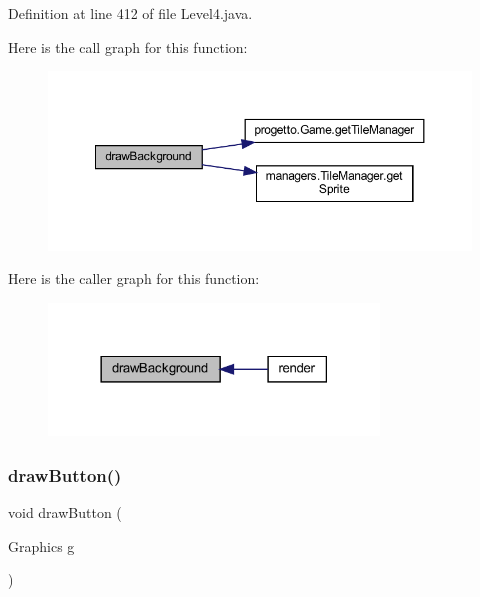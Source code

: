 Definition at line 412 of file Level4.\+java.

Here is the call graph for this function\+:
\nopagebreak
\begin{figure}[H]
\begin{center}
\leavevmode
\includegraphics[width=350pt]{classscenes_1_1_level4_a62bcb07be9e39896e5837a9d396e7235_cgraph}
\end{center}
\end{figure}
Here is the caller graph for this function\+:\nopagebreak
\begin{figure}[H]
\begin{center}
\leavevmode
\includegraphics[width=249pt]{classscenes_1_1_level4_a62bcb07be9e39896e5837a9d396e7235_icgraph}
\end{center}
\end{figure}
\mbox{\label{classscenes_1_1_level4_a65768678909bc0512c6cb9780709ad38}} 
\subsubsection{\texorpdfstring{draw\+Button()}{drawButton()}}
{\footnotesize\ttfamily void draw\+Button (\begin{DoxyParamCaption}\item[{Graphics}]{g }\end{DoxyParamCaption})\hspace{0.3cm}{\ttfamily [private]}}



